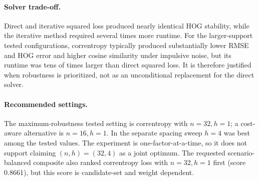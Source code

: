 \paragraph{Solver trade-off.}
Direct and iterative squared loss produced nearly identical HOG stability, while the iterative method required several times more runtime. For the larger-support tested configurations, correntropy typically produced substantially lower RMSE and HOG error and higher cosine similarity under impulsive noise, but its runtime was tens of times larger than direct squared loss. It is therefore justified when robustness is prioritized, not as an unconditional replacement for the direct solver.

\paragraph{Recommended settings.}
The maximum-robustness tested setting is correntropy with $n=32,h=1$; a cost-aware alternative is $n=16,h=1$. In the separate spacing sweep $h=4$ was best among the tested values. The experiment is one-factor-at-a-time, so it does not support claiming $(n,h)=(32,4)$ as a joint optimum. The requested scenario-balanced composite also ranked correntropy loss with $n=32,h=1$ first (score 0.8661), but this score is candidate-set and weight dependent.
